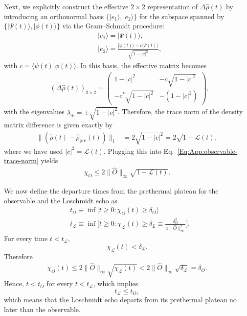 \documentclass[aps,prl,amsfonts,floatfix,superscriptaddress,longbibliography,twocolumn,footinbib]{revtex4-2}
\begin{document}
Next, we explicitly construct the effective $2\times 2$ representation of $\Delta\hat\rho(t)$ by introducing an orthonormal basis $\{|e_1\rangle,|e_2\rangle\}$ for the subspace spanned by $\{|\Psi(t)\rangle,|\phi(t)\rangle\}$ via the Gram--Schmidt procedure:
\begin{align}
    & |e_1\rangle = | \Psi(t) \rangle,\\
    & | e_2\rangle = \frac{|\phi(t) \rangle - c| \Psi(t) \rangle  }{\sqrt{1 - |c |^2}},
\end{align}
with $c= \langle \psi(t) |\phi(t)\rangle $.
In this basis, the effective matrix becomes 
\begin{align}
    & \left(\Delta \hat{\rho} (t)\right)_{2\times 2}  = \begin{pmatrix}
       1- |c |^2  & -c\sqrt{1 - |c |^2}\\
        -c^*\sqrt{1 - |c |^2} & -(1- |c |^2)
    \end{pmatrix},
\end{align}
with the eigenvalues $\lambda_{\pm} = \pm \sqrt{1- |c|^2}$. Therefore, the trace norm of the density matrix difference is given exactly by
\begin{align}
    \|(\hat\rho(t) - \hat\rho_{\text{pre}}(t))\|_1 & = 2 \sqrt{1- |c|^2} = 2\sqrt{1- \mathcal{L}(t) },
\end{align}
where we have used $|c|^2 = \mathcal{L}(t)$. Plugging this into Eq.~\eqref{Eq:App:observable-trace-norm} yields 
\begin{align} \label{eq:LE-inequality}
    \chi_O\le 2 \| \hat{O}\|_\infty\sqrt{1- \mathcal{L}(t)} .
\end{align}

We now define the departure times from the prethermal plateau for the observable and the Loschmidt echo as
\begin{align}
    & t_O \equiv \inf \biggr[  t\ge 0 : \chi_O(t) \ge \delta_O  \biggr] \\
    & t_\mathcal{L} \equiv \inf \biggr[  t\ge 0 : \chi_{\mathcal{L}}(t)  \ge \delta_L \equiv \frac{\delta_O^2}{4 \| \hat{O}\|_\infty^2} \biggr].
\end{align}
For every time $t<t_{\mathcal L}$,
\begin{equation}
  \chi_{\mathcal L}(t) < \delta_{\mathcal L} .  
\end{equation}
Therefore
\begin{align}
\chi_O(t) \le 2 \| \hat{O}\|_\infty \sqrt{\chi_{\mathcal L}(t)}  < 2
\|\hat O\|_\infty
\sqrt{\delta_{\mathcal L}} =
\delta_O.
\end{align}
Hence, $t<t_O$ for every $t<t_{\mathcal L}$, which implies 
\begin{equation}
t_{\mathcal{L}} \le t_{O}, 
\end{equation}
which means that the Loschmidt echo departs from its prethermal plateau no later than the observable.
\end{document}
